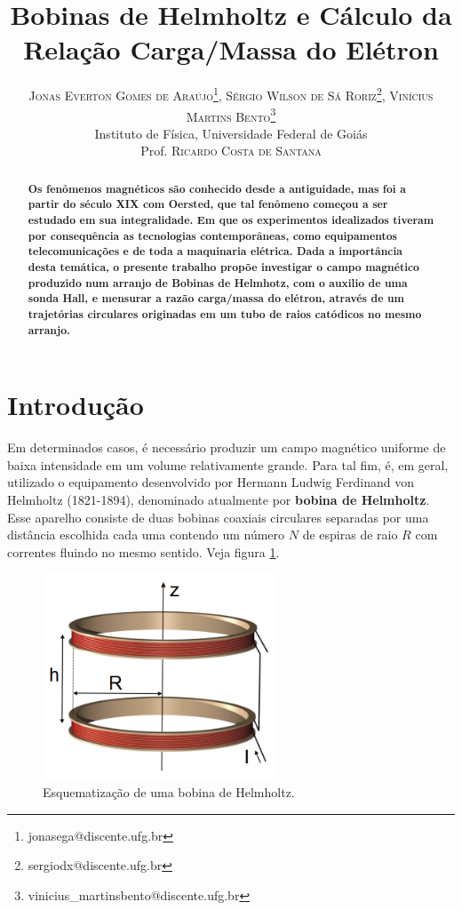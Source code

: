 \documentclass{article}
\title{\vspace{-18mm}\fontsize{16pt}{18pt}\selectfont\textbf{Bobinas de Helmholtz e Cálculo da Relação Carga/Massa do Elétron}}
\author{
\large
\textsc{Jonas Everton Gomes de Araújo\thanks{jonasega@discente.ufg.br }, Sérgio Wilson de Sá Roriz\thanks{sergiodx@discente.ufg.br}, Vinícius Martins Bento\thanks{vinicius\_martinsbento@discente.ufg.br}}\\[2mm]
\large Instituto de Física, Universidade Federal de Goiás \\
\large Prof. \textsc{Ricardo Costa de Santana}
}
\date{}
\begin{document}
\maketitle

\thispagestyle{fancy} 
 

\begin{abstract}
\textbf{Os fenômenos magnéticos são conhecido desde a antiguidade, mas foi a partir do século XIX com Oersted, que tal fenômeno começou a ser estudado em sua integralidade. Em que os experimentos idealizados tiveram por consequência as tecnologias contemporâneas, como equipamentos telecomunicações e de toda a maquinaria elétrica. Dada a importância desta temática, o presente trabalho propõe investigar o campo magnético produzido num arranjo de Bobinas de Helmhotz, com o auxilio de uma sonda Hall, e mensurar a razão carga/massa do elétron, através de um trajetórias circulares originadas em um tubo de raios catódicos no mesmo arranjo.}
\end{abstract}
%
\vspace{0.5cm}

\setlength{\columnsep}{10pt}%
\section{Introdução}

Em determinados casos, é necessário produzir um campo magnético uniforme de baixa intensidade em um volume relativamente grande. Para tal fim, é, em geral, utilizado o equipamento desenvolvido por Hermann Ludwig Ferdinand von Helmholtz (1821-1894), denominado atualmente por \textbf{bobina de Helmholtz}. Esse aparelho consiste de duas bobinas coaxiais circulares separadas por uma distância escolhida cada uma contendo um número $N$ de espiras de raio $R$ com correntes fluindo no mesmo sentido. Veja figura \ref{helmholtz}.

\begin{figure}
    \centering
    \includegraphics[width=7cm]{./Imagens/Helmholtz.png}
    \caption{Esquematização de uma bobina de Helmholtz. }
    \label{helmholtz}
\end{figure}
\end{document}
